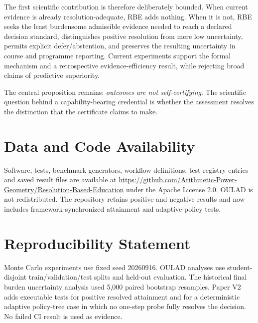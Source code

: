 \documentclass[11pt]{article}
\begin{document}
The first scientific contribution is therefore deliberately bounded. When current evidence is already resolution-adequate, RBE adds nothing. When it is not, RBE seeks the least burdensome admissible evidence needed to reach a declared decision standard, distinguishes positive resolution from mere low uncertainty, permits explicit defer/abstention, and preserves the resulting uncertainty in course and programme reporting. Current experiments support the formal mechanism and a retrospective evidence-efficiency result, while rejecting broad claims of predictive superiority.

The central proposition remains: \emph{outcomes are not self-certifying}. The scientific question behind a capability-bearing credential is whether the assessment resolves the distinction that the certificate claims to make.

\section*{Data and Code Availability}
\begingroup\sloppy
Software, tests, benchmark generators, workflow definitions, test registry entries and saved result files are available at \url{https://github.com/Arithmetic-Power-Geometry/Resolution-Based-Education} under the Apache License 2.0. OULAD is not redistributed. The repository retains positive and negative results and now includes framework-synchronized attainment and adaptive-policy tests.\par
\endgroup

\section*{Reproducibility Statement}
Monte Carlo experiments use fixed seed 20260916. OULAD analyses use student-disjoint train/validation/test splits and held-out evaluation. The historical final burden uncertainty analysis used 5,000 paired bootstrap resamples. Paper V2 adds executable tests for positive resolved attainment and for a deterministic adaptive policy-tree case in which no one-step probe fully resolves the decision. No failed CI result is used as evidence.

\printbibliography
\end{document}
